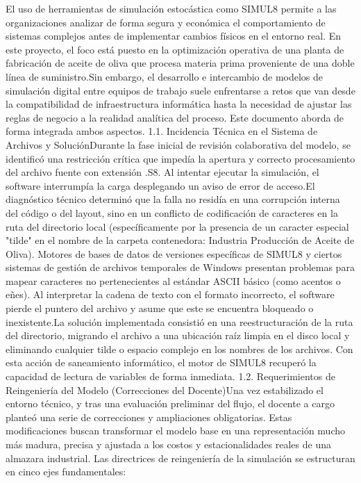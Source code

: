 \documentclass[runningheads]{llncs}
\begin{document}
El uso de herramientas de simulación estocástica como SIMUL8 permite a las organizaciones analizar de forma segura y económica el comportamiento de sistemas complejos antes de implementar cambios físicos en el entorno real. En este proyecto, el foco está puesto en la optimización operativa de una planta de fabricación de aceite de oliva que procesa materia prima proveniente de una doble línea de suministro.Sin embargo, el desarrollo e intercambio de modelos de simulación digital entre equipos de trabajo suele enfrentarse a retos que van desde la compatibilidad de infraestructura informática hasta la necesidad de ajustar las reglas de negocio a la realidad analítica del proceso. Este documento aborda de forma integrada ambos aspectos.
1.1. Incidencia Técnica en el Sistema de Archivos y SoluciónDurante la fase inicial de revisión colaborativa del modelo, se identificó una restricción crítica que impedía la apertura y correcto procesamiento del archivo fuente con extensión .S8. Al intentar ejecutar la simulación, el software interrumpía la carga desplegando un aviso de error de acceso.El diagnóstico técnico determinó que la falla no residía en una corrupción interna del código o del layout, sino en un conflicto de codificación de caracteres en la ruta del directorio local (específicamente por la presencia de un caracter especial "tilde" en el nombre de la carpeta contenedora: Industria Producción de Aceite de Oliva). Motores de bases de datos de versiones específicas de SIMUL8 y ciertos sistemas de gestión de archivos temporales de Windows presentan problemas para mapear caracteres no pertenecientes al estándar ASCII básico (como acentos o eñes). Al interpretar la cadena de texto con el formato incorrecto, el software pierde el puntero del archivo y asume que este se encuentra bloqueado o inexistente.La solución implementada consistió en una reestructuración de la ruta del directorio, migrando el archivo a una ubicación raíz limpia en el disco local y eliminando cualquier tilde o espacio complejo en los nombres de los archivos. Con esta acción de saneamiento informático, el motor de SIMUL8 recuperó la capacidad de lectura de variables de forma inmediata.
1.2. Requerimientos de Reingeniería del Modelo (Correcciones del Docente)Una vez estabilizado el entorno técnico, y tras una evaluación preliminar del flujo, el docente a cargo planteó una serie de correcciones y ampliaciones obligatorias. Estas modificaciones buscan transformar el modelo base en una representación mucho más madura, precisa y ajustada a los costos y estacionalidades reales de una almazara industrial. Las directrices de reingeniería de la simulación se estructuran en cinco ejes fundamentales:
\end{document}
